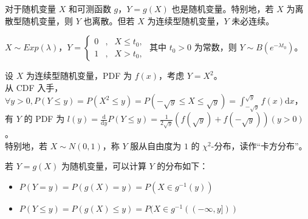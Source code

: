 \documentclass[../main.tex]{subfiles}
\begin{document}
对于随机变量 $X$ 和可测函数 $g$，$Y=g(X)$ 也是随机变量。特别地，若 $X$ 为离散型随机变量，则 $Y$ 也离散。但若 $X$ 为连续型随机变量，$Y$ 未必连续。

\begin{example}
    $X\sim Exp(\lambda)$，$Y=
    \left\{\begin{aligned}
            0 & , & X\leq t_0, \\
            1 & , & X>t_0,
        \end{aligned}\right.$ 其中 $t_0>0$ 为常数，则 $Y\sim B(e^{-\lambda t_0})$。
\end{example}

\begin{example}
    设 $X$ 为连续型随机变量，PDF 为 $f(x)$，考虑 $Y=X^2$。\\
    从 CDF 入手，$\forall y>0,P(Y\leq y)=P(X^2\leq y)=P(-\sqrt{y}\leq X\leq \sqrt{y})=\int_{-\sqrt{y}}^{\sqrt{y}}f(x)\mathrm{d}x$，有 $Y$ 的 PDF 为 $l(y)=\frac{\mathrm{d}}{\mathrm{d}y}P(Y\leq y)=\frac{1}{2\sqrt{y}}(f(\sqrt{y})+f(-\sqrt{y}))(y>0)$。\\
    特别地，若 $X\sim N(0,1)$，称 $Y$ 服从自由度为 $1$ 的 $\chi^2$-分布，读作“卡方分布”。
\end{example}

若 $Y=g(X)$ 为随机变量，可以计算 $Y$ 的分布如下：
\begin{itemize}
    \item $P(Y=y)=P(g(X)=y)=P(X\in g^{-1}(y))$
    \item $P(Y\leq y)=P(g(X)\leq y)=P(X\in g^{-1}((-\infty,y]))$
\end{itemize}
\end{document}
